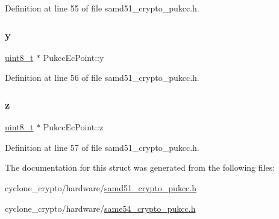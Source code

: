 Definition at line 55 of file samd51\+\_\+crypto\+\_\+pukcc.\+h.

\mbox{\label{structPukccEcPoint_aa4efb7c13982bb8c7dbb8805a7798d9b}} 
\subsubsection{\texorpdfstring{y}{y}}
{\footnotesize\ttfamily \hyperlink{stdint_8h_aba7bc1797add20fe3efdf37ced1182c5}{uint8\+\_\+t} $\ast$ Pukcc\+Ec\+Point\+::y}



Definition at line 56 of file samd51\+\_\+crypto\+\_\+pukcc.\+h.

\mbox{\label{structPukccEcPoint_a4c9d0fd92c00c7bf6bd0d8c9584c1f62}} 
\subsubsection{\texorpdfstring{z}{z}}
{\footnotesize\ttfamily \hyperlink{stdint_8h_aba7bc1797add20fe3efdf37ced1182c5}{uint8\+\_\+t} $\ast$ Pukcc\+Ec\+Point\+::z}



Definition at line 57 of file samd51\+\_\+crypto\+\_\+pukcc.\+h.



The documentation for this struct was generated from the following files\+:\begin{DoxyCompactItemize}
\item 
cyclone\+\_\+crypto/hardware/\hyperlink{samd51__crypto__pukcc_8h}{samd51\+\_\+crypto\+\_\+pukcc.\+h}\item 
cyclone\+\_\+crypto/hardware/\hyperlink{same54__crypto__pukcc_8h}{same54\+\_\+crypto\+\_\+pukcc.\+h}\end{DoxyCompactItemize}
